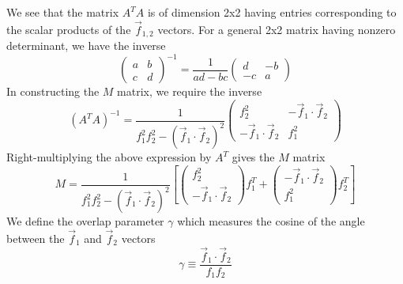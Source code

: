 We see that the matrix $A^T A$ is of dimension 2x2 having entries corresponding to the scalar products of the $\vec{f}_{1,2}$ vectors. For a general 2x2 matrix having nonzero determinant, we have the inverse
\begin{equation*}
	\begin{pmatrix}
		a & b \\ c & d
	\end{pmatrix} ^ {-1}
	=
	\frac{1}{ad - bc}
	\begin{pmatrix}
		d & -b \\ -c & a
	\end{pmatrix}
\end{equation*}
In constructing the $M$ matrix, we require the inverse
\begin{equation}
	\left(A^T A\right)^{-1} = \frac{1}{f_1^2 f_2^2 - \left(\vec{f}_1\cdot\vec{f}_2\right)^2}
	\begin{pmatrix}
		f_2^2 & -\vec{f}_1\cdot\vec{f}_2 \\
		-\vec{f}_1\cdot\vec{f}_2 & f_1^2
	\end{pmatrix}
\end{equation}
Right-multiplying the above expression by $A^T$ gives the $M$ matrix
\begin{equation}
	M = \frac{1}{f_1^2 f_2^2 - \left(\vec{f}_1\cdot\vec{f}_2\right)^2}
	\left[
	\begin{pmatrix} f_2^2 \\ -\vec{f}_1 \cdot \vec{f}_2 \end{pmatrix} f_1^T +
	\begin{pmatrix} -\vec{f}_1 \cdot \vec{f}_2 \\ f_1^2 \end{pmatrix} f_2^T
	\right]
\end{equation}
We define the overlap parameter $\gamma$ which measures the cosine of the angle between the \newline $\vec{f}_1$ and $\vec{f}_2$ vectors
\begin{equation}
	\gamma \equiv \frac{\vec f_1\cdot\vec f_2}{f_1f_2}
\end{equation}
